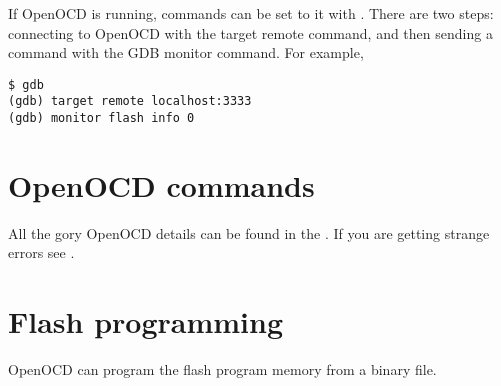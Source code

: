 If OpenOCD is running, commands can be set to it with
. There are two steps: connecting to OpenOCD with
the target remote command, and then sending a command with the GDB
monitor command. For example,

\begin{verbatim}
$ gdb
(gdb) target remote localhost:3333
(gdb) monitor flash info 0
\end{verbatim}

\section{OpenOCD commands}
\label{openocd-commands}

All the gory OpenOCD details can be found in the
. If you are getting strange
errors see .

\section{Flash programming}
\label{flash-programming}

OpenOCD can program the flash program memory from a binary file.





